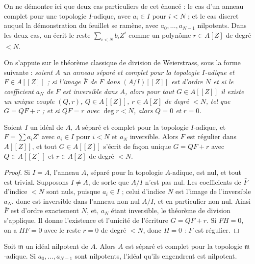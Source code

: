 \noindent On ne démontre ici que deux cas particuliers de cet énoncé : le cas d'un anneau complet pour une topologie $I$-adique, avec $a_i \in I$ pour $i < N$ ; et le cas discret auquel la démonstration du feuillet se ramène, avec $a_0, \dots, a_{N-1}$ nilpotents. Dans les deux cas, on écrit le reste $\sum_{i<N} b_i Z^i$ comme un polynôme $r \in A[Z]$ de degré $< N$.

On s'appuie sur le théorème classique de division de Weierstrass, sous la forme suivante : \emph{soient $A$ un anneau séparé et complet pour la topologie $I$-adique et $F \in A[[Z]]$ ; si l'image $\bar F$ de $F$ dans $(A/I)[[Z]]$ est d'ordre $N$ et si le coefficient $a_N$ de $F$ est inversible dans $A$, alors pour tout $G \in A[[Z]]$ il existe un unique couple $(Q, r)$, $Q \in A[[Z]]$, $r \in A[Z]$ de degré $< N$, tel que $G = QF + r$ ; et si $QF = r$ avec $\deg r < N$, alors $Q = 0$ et $r = 0$.}

\begin{lemme}\label{lem:39-adique}
Soient $I$ un idéal de $A$, $A$ séparé et complet pour la topologie $I$-adique, et $F = \sum a_i Z^i$ avec $a_i \in I$ pour $i < N$ et $a_N$ inversible. Alors $F$ est régulier dans $A[[Z]]$, et tout $G \in A[[Z]]$ s'écrit de façon unique $G = QF + r$ avec $Q \in A[[Z]]$ et $r \in A[Z]$ de degré $< N$.
\end{lemme}

\begin{proof}
Si $I = A$, l'anneau $A$, séparé pour la topologie $A$-adique, est nul, et tout est trivial. Supposons $I \neq A$, de sorte que $A/I$ n'est pas nul. Les coefficients de $\bar F$ d'indice $< N$ sont nuls, puisque $a_i \in I$ ; celui d'indice $N$ est l'image de l'inversible $a_N$, donc est inversible dans l'anneau non nul $A/I$, et en particulier non nul. Ainsi $\bar F$ est d'ordre exactement $N$, et, $a_N$ étant inversible, le théorème de division s'applique. Il donne l'existence et l'unicité de l'écriture $G = QF + r$. Si $FH = 0$, on a $HF = 0$ avec le reste $r = 0$ de degré $< N$, donc $H = 0$ : $F$ est régulier.
\end{proof}

\begin{lemme}\label{lem:39-nilp}
Soit $\mathfrak m$ un idéal nilpotent de $A$. Alors $A$ est séparé et complet pour la topologie $\mathfrak m$-adique. Si $a_0, \dots, a_{N-1}$ sont nilpotents, l'idéal qu'ils engendrent est nilpotent.
\end{lemme}

